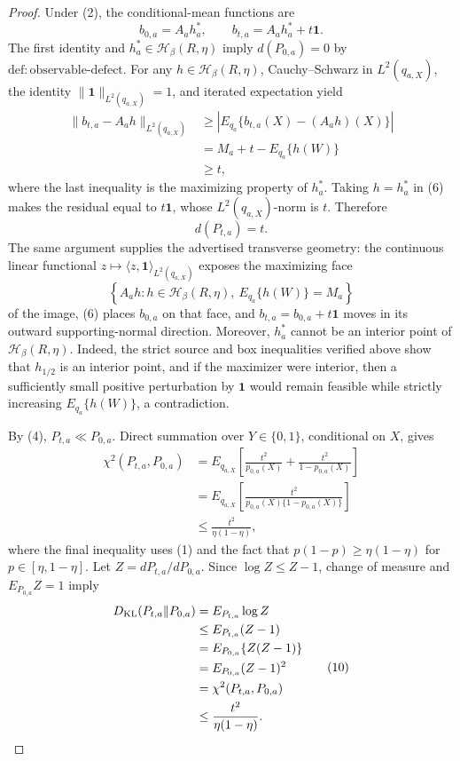 \documentclass{article}
\begin{document}
\begin{proof}
Under (2), the conditional-mean functions are
\[
b_{0,a}=A_a h_a^*,
\qquad
b_{t,a}=A_a h_a^*+t\mathbf 1. \tag{6}
\]
The first identity and \(h_a^*\in\mathcal H_\beta(R,\eta)\) imply \(d(P_{0,a})=0\) by \(\mathrm{def:observable\mbox{-}defect}\). For any \(h\in\mathcal H_\beta(R,\eta)\), Cauchy--Schwarz in \(L^2(q_{a,X})\), the identity \(\|\mathbf1\|_{L^2(q_{a,X})}=1\), and iterated expectation yield
\[
\begin{aligned}
\|b_{t,a}-A_a h\|_{L^2(q_{a,X})}
&\ge \left|E_{q_a}\{b_{t,a}(X)-(A_a h)(X)\}\right|\\
&=M_a+t-E_{q_a}\{h(W)\}\\
&\ge t,
\end{aligned} \tag{7}
\]
where the last inequality is the maximizing property of \(h_a^*\). Taking \(h=h_a^*\) in (6) makes the residual equal to \(t\mathbf1\), whose \(L^2(q_{a,X})\)-norm is \(t\). Therefore
\[
d(P_{t,a})=t. \tag{8}
\]
The same argument supplies the advertised transverse geometry: the continuous linear functional \(z\mapsto\langle z,\mathbf1\rangle_{L^2(q_{a,X})}\) exposes the maximizing face
\[
\left\{A_a h:h\in\mathcal H_\beta(R,\eta),\ E_{q_a}\{h(W)\}=M_a\right\}
\]
of the image, (6) places \(b_{0,a}\) on that face, and \(b_{t,a}=b_{0,a}+t\mathbf1\) moves in its outward supporting-normal direction. Moreover, \(h_a^*\) cannot be an interior point of \(\mathcal H_\beta(R,\eta)\). Indeed, the strict source and box inequalities verified above show that \(h_{1/2}\) is an interior point, and if the maximizer were interior, then a sufficiently small positive perturbation by \(\mathbf1\) would remain feasible while strictly increasing \(E_{q_a}\{h(W)\}\), a contradiction.

By (4), \(P_{t,a}\ll P_{0,a}\). Direct summation over \(Y\in\{0,1\}\), conditional on \(X\), gives
\[
\begin{aligned}
\chi^2(P_{t,a},P_{0,a})
&=E_{q_{a,X}}\!\left[
  \frac{t^2}{p_{0,a}(X)}+
  \frac{t^2}{1-p_{0,a}(X)}\right]\\
&=E_{q_{a,X}}\!\left[
  \frac{t^2}{p_{0,a}(X)\{1-p_{0,a}(X)\}}\right]\\
&\le\frac{t^2}{\eta(1-\eta)},
\end{aligned} \tag{9}
\]
where the final inequality uses (1) and the fact that \(p(1-p)\ge\eta(1-\eta)\) for \(p\in[\eta,1-\eta]\). Let \(Z=dP_{t,a}/dP_{0,a}\). Since \(\log Z\le Z-1\), change of measure and \(E_{P_{0,a}}Z=1\) imply
\[
\begin{aligned}
D_{\rm KL}(P_{t,a}\|P_{0,a})
&=E_{P_{t,a}}\log Z\\
&\le E_{P_{t,a}}(Z-1)\\
&=E_{P_{0,a}}\{Z(Z-1)\}\\
&=E_{P_{0,a}}(Z-1)^2\\
&=\chi^2(P_{t,a},P_{0,a})\\
&\le\frac{t^2}{\eta(1-\eta)}. 
\end{aligned} \tag{10}
\]


\end{proof}
\end{document}
